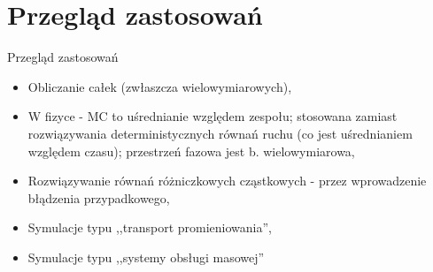 \section{Przegląd zastosowań}
\begin{frame}{Przegląd zastosowań}
	\begin{itemize}
		\item Obliczanie całek (zwłaszcza wielowymiarowych),
        \item W fizyce - MC to uśrednianie względem zespołu; stosowana zamiast rozwiązywania deterministycznych równań ruchu (co jest uśrednianiem względem czasu); przestrzeń fazowa jest b. wielowymiarowa,
        \item Rozwiązywanie równań różniczkowych cząstkowych - przez wprowadzenie błądzenia przypadkowego,
        \item Symulacje typu ,,transport promieniowania'',
        \item Symulacje typu ,,systemy obsługi masowej''
	\end{itemize}
\end{frame}